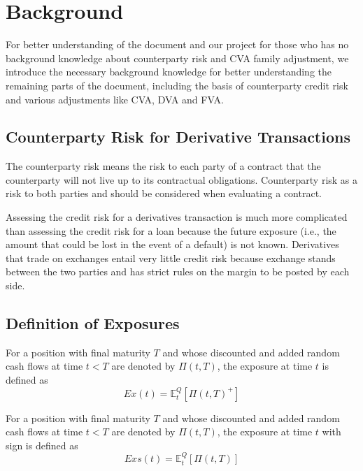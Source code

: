 \section{Background}\label{sec:background}

For better understanding of the document and our project for those who has no background knowledge about counterparty risk and CVA family adjustment, we introduce the necessary background knowledge for better understanding the remaining parts of the document, including the basis of counterparty credit risk and various adjustments like CVA, DVA and FVA.

\subsection{Counterparty Risk for Derivative Transactions}
The counterparty risk means the risk to each party of a contract that the counterparty will not live up to its contractual obligations. Counterparty risk as a risk to both parties and should be considered when evaluating a contract.

Assessing the credit risk for a derivatives transaction is much more complicated than assessing the credit risk for a loan because the future exposure (i.e., the amount that could be lost in the event of a default) is not known. Derivatives that trade on exchanges entail very little credit risk because exchange stands between the two parties and has strict rules on the margin to be posted by each side.

\subsection{Definition of Exposures}

\begin{definition}
For a position with final maturity $T$ and whose discounted and added random cash flows at time $t < T$ are denoted by $\Pi(t,T)$, the exposure at time $t$ is defined as
$$ Ex(t)= \mathbb{E}_t^Q[\Pi(t,T)^+] $$
\end{definition}

\begin{definition}
For a position with final maturity $T$ and whose discounted and added random cash flows at time $t < T$ are denoted by $\Pi(t,T)$, the exposure at time $t$ with sign is defined as
$$ Exs(t)= \mathbb{E}_t^Q[\Pi(t,T)] $$
\end{definition}

